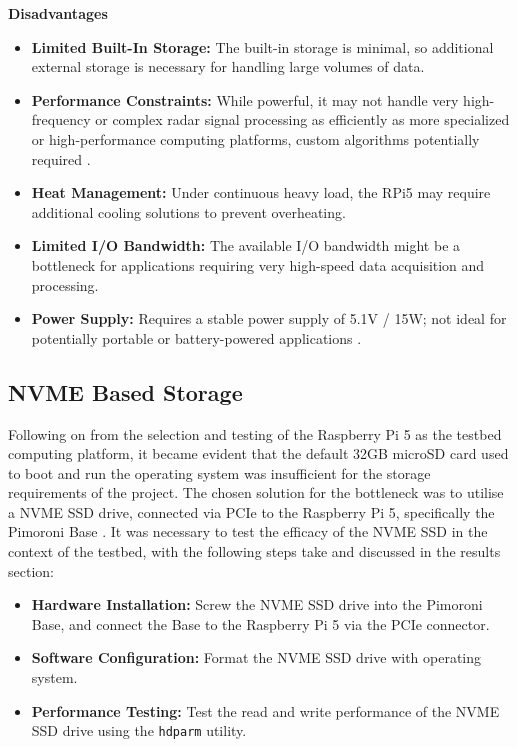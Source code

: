 \noindent \textbf{Disadvantages}
\begin{itemize}
    \item \textbf{Limited Built-In Storage:} The built-in storage is minimal, so additional external storage is necessary for handling large volumes of data.
    \item \textbf{Performance Constraints:} While powerful, it may not handle very high-frequency or complex radar signal processing as efficiently as more specialized or high-performance computing platforms, custom algorithms potentially required \cite{IOTpassiveRadar}.
    \item \textbf{Heat Management:} Under continuous heavy load, the RPi5 may require additional cooling solutions to prevent overheating.
    \item \textbf{Limited I/O Bandwidth:} The available I/O bandwidth might be a bottleneck for applications requiring very high-speed data acquisition and processing.
    \item \textbf{Power Supply:} Requires a stable power supply of 5.1V / 15W; not ideal for potentially portable or battery-powered applications \cite{rpi5_wifi}. 
\end{itemize}



\subsection{NVME Based Storage \label{sec:storage}}
Following on from the selection and testing of the Raspberry Pi 5 as the testbed computing platform, it became evident that the default 32GB microSD card used to boot and run the operating system was insufficient for the storage requirements of the project. The chosen solution for the bottleneck was to utilise a NVME SSD drive, connected via PCIe to the Raspberry Pi 5, specifically the Pimoroni Base \cite{pimoroni_nvme_base}. It was necessary to test the efficacy of the NVME SSD in the context of the testbed, with the following steps take and discussed in the results section:
\begin{itemize}
    \item \textbf{Hardware Installation:} Screw the NVME SSD drive into the Pimoroni Base, and connect the Base to the Raspberry Pi 5 via the PCIe connector.
    \item \textbf{Software Configuration:} Format the NVME SSD drive with operating system.
    \item \textbf{Performance Testing:} Test the read and write performance of the NVME SSD drive using the \texttt{hdparm} utility.
\end{itemize}

